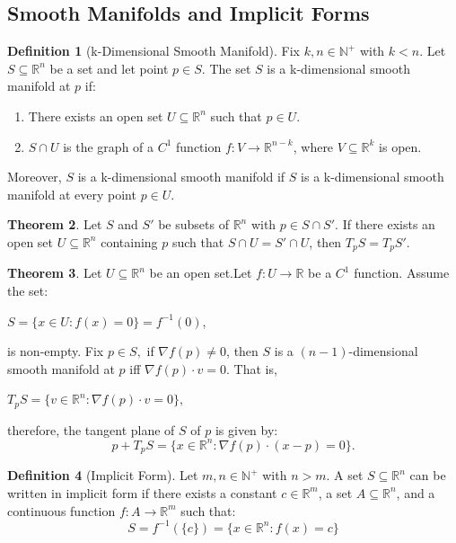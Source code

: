 \documentclass[12pt]{article}
\theoremstyle{definition}
\newtheorem{definition}{Definition}[subsection]
\newtheorem{theorem}[definition]{Theorem}
\theoremstyle{remark}
\begin{document}
\subsection{Smooth Manifolds and Implicit Forms}
\begin{definition}[k-Dimensional Smooth Manifold]
Fix $k,n\in \mathbb{N}^+$ with $k<n.$ Let $S\subseteq\mathbb{R}^n$ be a set and let point $p\in S.$ The set $S$ is a k-dimensional smooth manifold at $p$ if:
\begin{enumerate}[label=(\arabic*)]
\item There exists an open set $U\subseteq \mathbb{R}^n$ such that $p\in U$.
\item $S\cap U$ is the graph of a $C^1$ function $f:V\rightarrow \mathbb{R}^{n-k}$, where $V\subseteq\mathbb{R}^k$ is open.
\end{enumerate}  Moreover, $S$ is a k-dimensional smooth manifold if $S$ is a k-dimensional smooth manifold at every point $p\in U.$
\end{definition}

\begin{theorem}
Let $S$ and $S'$ be subsets of $\mathbb{R}^n$ with $p\in S\cap S'.$ If there exists an open set $U\subseteq \mathbb{R}^n$ containing $p$ such that $S\cap U=S'\cap U$, then $T_pS=T_pS'.$ 
\end{theorem}

\begin{theorem}
Let $U\subseteq \mathbb{R}^n$ be an open set.Let $f:U\rightarrow \mathbb{R}$ be a $C^1$ function. Assume the set:

\hfil $S=\{x\in U: f(x)=0\}=f^{-1}(0)$, \hfil

is non-empty. Fix $p\in S,$ if $\nabla f(p)\neq0$, then $S$ is a $(n-1)$-dimensional smooth manifold at $p$ iff $\nabla f(p)\cdot v=0.$ That is,

\hfil $T_pS=\{v\in\mathbb{R}^n: \nabla f(p)\cdot v=0\},$\hfil

therefore, the tangent plane of $S$ of $p$ is given by:
\[
p+T_pS=\{x\in\mathbb{R}^n: \nabla f(p)\cdot (x-p)=0\}.
\]
\end{theorem}

\begin{definition}[Implicit Form]
Let $m,n\in\mathbb{N}^+$ with $n>m$. A set $S\subseteq\mathbb{R}^n$ can be written in implicit form if there exists a constant $c\in\mathbb{R}^m$, a set $A\subseteq\mathbb{R}^n$, and a continuous function $f:A\to\mathbb{R}^m$ such that:
\[
S=f^{-1}(\{c\})=\{x\in\mathbb{R}^n: f(x)=c\}
\]
\end{definition}
\end{document}
